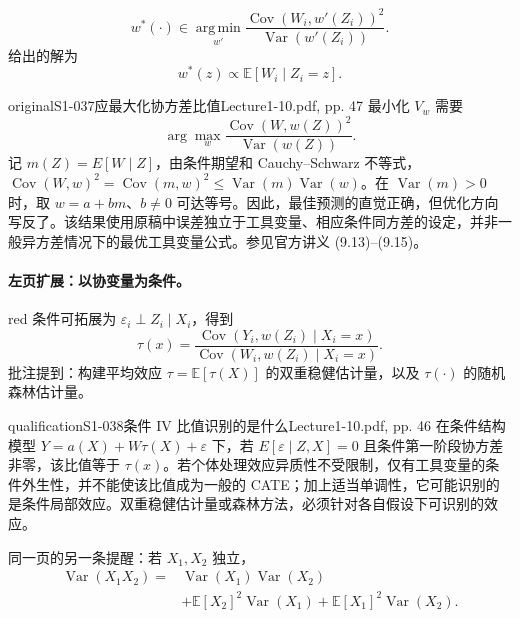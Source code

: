 \[
 w^*(\cdot)\in\operatorname*{arg\,min}_{w'}
 \frac{\operatorname{Cov}(W_i,w'(Z_i))^2}{\operatorname{Var}(w'(Z_i))}.
\]
给出的解为
\[
 w^*(z)\propto\mathbb E[W_i\mid Z_i=z].
\]
\begin{reviewnote}{original}{S1-037}{应最大化协方差比值}{Lecture1-10.pdf, pp. 47}
最小化 $V_w$ 需要
\[
\arg\max_w\frac{\operatorname{Cov}(W,w(Z))^2}{\operatorname{Var}(w(Z))}.
\]
记 $m(Z)=E[W\mid Z]$，由条件期望和 Cauchy--Schwarz 不等式，$\operatorname{Cov}(W,w)^2=\operatorname{Cov}(m,w)^2\le\operatorname{Var}(m)\operatorname{Var}(w)$。在 $\operatorname{Var}(m)>0$ 时，取 $w=a+bm$、$b\ne0$ 可达等号。因此，最佳预测的直觉正确，但优化方向写反了。该结果使用原稿中误差独立于工具变量、相应条件同方差的设定，并非一般异方差情况下的最优工具变量公式。参见官方讲义 (9.13)--(9.15)。
\end{reviewnote}



\paragraph{左页扩展：以协变量为条件。}
\begin{inkblock}{red}
条件可拓展为 $\varepsilon_i\perp Z_i\mid X_i$，得到
\[
 \tau(x)=\frac{\operatorname{Cov}(Y_i,w(Z_i)\mid X_i=x)}
 {\operatorname{Cov}(W_i,w(Z_i)\mid X_i=x)}.
\]
批注提到：构建平均效应 $\tau=\mathbb E[\tau(X)]$ 的双重稳健估计量，以及 $\tau(\cdot)$ 的随机森林估计量。
\end{inkblock}

\begin{reviewnote}{qualification}{S1-038}{条件 IV 比值识别的是什么}{Lecture1-10.pdf, pp. 46}
在条件结构模型 $Y=a(X)+W\tau(X)+\varepsilon$ 下，若 $E[\varepsilon\mid Z,X]=0$ 且条件第一阶段协方差非零，该比值等于 $\tau(x)$。若个体处理效应异质性不受限制，仅有工具变量的条件外生性，并不能使该比值成为一般的 CATE；加上适当单调性，它可能识别的是条件局部效应。双重稳健估计量或森林方法，必须针对各自假设下可识别的效应。
\end{reviewnote}


同一页的另一条提醒：若 $X_1,X_2$ 独立，
\begin{align*}
 \operatorname{Var}(X_1X_2)
 ={}&\operatorname{Var}(X_1)\operatorname{Var}(X_2)\\
 &+\mathbb E[X_2]^2\operatorname{Var}(X_1)
 +\mathbb E[X_1]^2\operatorname{Var}(X_2).
\end{align*}

